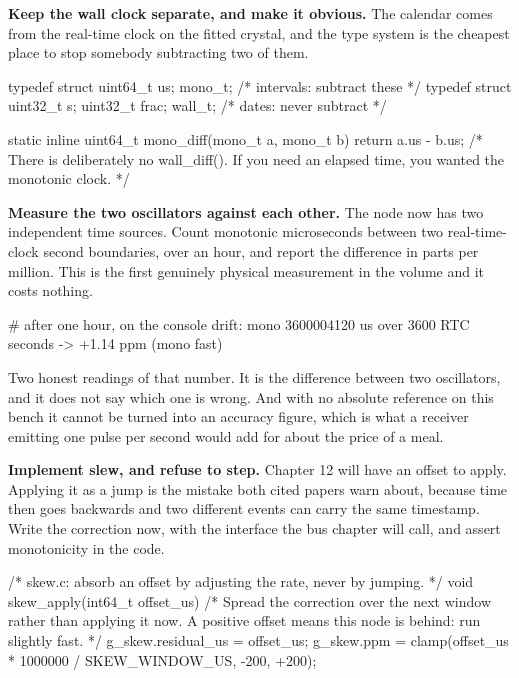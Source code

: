 \begin{steps}
\item \textbf{Keep the wall clock separate, and make it obvious.} The calendar
comes from the real-time clock on the fitted crystal, and the type system is
the cheapest place to stop somebody subtracting two of them.
\begin{ccode}
typedef struct { uint64_t us; }        mono_t;   /* intervals: subtract these */
typedef struct { uint32_t s; uint32_t frac; } wall_t;  /* dates: never subtract */

static inline uint64_t mono_diff(mono_t a, mono_t b) { return a.us - b.us; }
/* There is deliberately no wall_diff(). If you need an elapsed time, you
   wanted the monotonic clock. */
\end{ccode}

\item \textbf{Measure the two oscillators against each other.} The node now has
two independent time sources. Count monotonic microseconds between two
real-time-clock second boundaries, over an hour, and report the difference in
parts per million. This is the first genuinely physical measurement in the
volume and it costs nothing.
\begin{shellcode}
# after one hour, on the console
drift: mono 3600004120 us over 3600 RTC seconds -> +1.14 ppm (mono fast)
\end{shellcode}
Two honest readings of that number. It is the difference between two
oscillators, and it does not say which one is wrong. And with no absolute
reference on this bench it cannot be turned into an accuracy figure, which is
what a receiver emitting one pulse per second would add for about the price of a
meal.

\item \textbf{Implement slew, and refuse to step.} Chapter 12 will have an
offset to apply. Applying it as a jump is the mistake both cited papers warn
about, because time then goes backwards and two different events can carry the
same timestamp. Write the correction now, with the interface the bus chapter
will call, and assert monotonicity in the code.
\begin{ccode}
/* skew.c: absorb an offset by adjusting the rate, never by jumping. */
void skew_apply(int64_t offset_us)
{
    /* Spread the correction over the next window rather than applying it now.
       A positive offset means this node is behind: run slightly fast. */
    g_skew.residual_us = offset_us;
    g_skew.ppm = clamp(offset_us * 1000000 / SKEW_WINDOW_US, -200, +200);
}


\end{ccode}
\end{steps}
